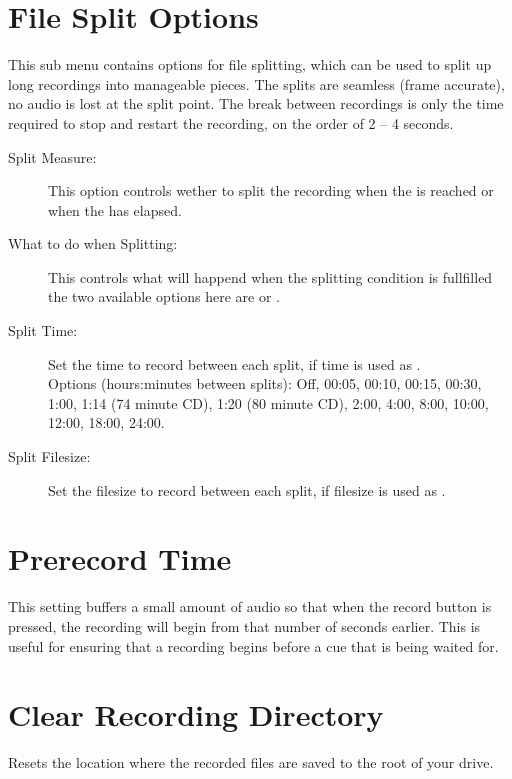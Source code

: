 \section{File Split Options}
  This sub menu contains options for file splitting, which can be used to split
  up long recordings into manageable pieces. The splits are seamless (frame
  accurate), no audio is lost at the split point. The break between recordings
  is only the time required to stop and restart the recording, on the order of
  2 -- 4 seconds.
  \begin{description}
    \item[Split Measure:]
      This option controls wether to split the recording when the
       is reached or when the
       has elapsed.

    \item[What to do when Splitting:]
      This controls what will happend when the splitting condition is
      fullfilled the two available options here are
       or .

    \item[Split Time:]
      Set the time to record between each split, if time is used as
      .\\
      Options (hours:minutes between splits): Off, 00:05, 00:10, 00:15, 00:30,
      1:00, 1:14 (74 minute  CD), 1:20 (80 minute CD), 2:00, 4:00, 8:00, 10:00,
      12:00, 18:00, 24:00.

    \item[Split Filesize:]
      Set the filesize to record between each split, if filesize is used as
      .

  \end{description}

\section{Prerecord Time}
    This setting buffers a small amount of audio so that when the record button
    is pressed, the recording will begin from that number of seconds earlier.
    This is useful for ensuring that a recording begins before a cue that is
    being waited for.

\section{Clear Recording Directory}
    Resets the location where the recorded files are saved to the root of your
    \daps{} drive.

